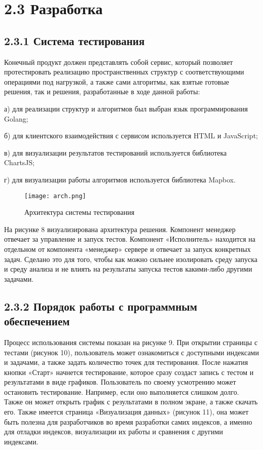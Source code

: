 \section{2.3 Разработка}
\label{cha:development}

\subsection{2.3.1 Система тестирования}

Конечный продукт должен представлять собой сервис, который позволяет протестировать реализацию пространственных структур с соответствующими операциями под нагрузкой, а также сами алгоритмы, как взятые готовые решения, так и решения, разработанные в ходе данной работы:
\par а) для реализации структур и алгоритмов был выбран язык программирования Golang;
\par б) для клиентского взаимодействия с сервисом используется HTML и JavaScript;
\par в) для визуализации результатов тестирований используется библиотека ChartsJS;
\par г) для визуализации работы алгоритмов используется библиотека Mapbox.
  
\par\vspace{1em}
\begin{figure}[H]
    \centering
    \texttt{[image: arch.png]}
    \caption{Архитектура системы тестирования}
\end{figure}

На рисунке 8 визуализирована архитектура решения. Компонент менеджер отвечает за управление и запуск тестов. Компонент «Исполнитель» находится на отдельном от компонента «менеджер» сервере и отвечает за запуск конкретных задач. Сделано это для того, чтобы как можно сильнее изолировать среду запуска и среду анализа и не влиять на результаты запуска тестов какими-либо другими задачами. 


\subsection{2.3.2 Порядок работы с программным обеспечением}
Процесс использования системы показан на рисунке 9. При открытии страницы с тестами (рисунок 10), пользователь может ознакомиться с доступными индексами и задачами, а также задать количество точек для тестирования. После нажатия кнопки «Старт» начнется тестирование, которое сразу создаст запись с тестом и результатами в виде графиков. 
Пользователь по своему усмотрению может остановить тестирование. Например, если оно выполняется слишком долго. Также он может открыть график с результатами в полном экране, а также скачать его. 
Также имеется страница «Визуализация данных» (рисунок 11), она может быть полезна для разработчиков во время разработки самих индексов, а именно для отладки индексов, визуализации их работы и сравнения с другими индексами. 


